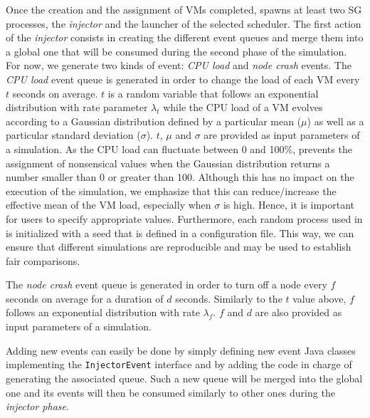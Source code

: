 Once the creation and the assignment of VMs completed, \vmps spawns at
least two SG processes, the \emph{injector} and the launcher of the
selected scheduler.  The first action of the \emph{injector} consists
in creating the different event queues and merge them into a global
one that will be consumed during the second phase of the simulation.
For now, we generate two kinds of event: \emph{CPU load} and
\emph{node crash} events.
%
The \emph{CPU load} event queue is generated in order to change the
load of each VM every $t$ seconds on average. $t$ is a random variable
that follows an exponential distribution with rate parameter
$\lambda_t$ while the CPU load of a VM evolves according to a Gaussian
distribution defined by a particular mean ($\mu$) as well as a
particular standard deviation ($\sigma$). $t$, $\mu$ and $\sigma$ are
provided as input parameters of a simulation.  As the CPU load can
fluctuate between 0 and 100\%, \vmps prevents the assignment of
nonsensical values when the Gaussian distribution returns a number
smaller than 0 or greater than 100. Although this has no impact on the
execution of the simulation, we emphasize that this can
reduce/increase the effective mean of the VM load, especially when
$\sigma$ is high.  Hence, it is important for users to specify
appropriate values.
Furthermore, each random process used in \vmps is initialized with a
seed that is defined in a configuration file. This way, we can ensure
that different simulations are reproducible and may be used to
establish fair comparisons.

The \emph{node crash} event queue is generated in order to turn off a
node every $f$ seconds on average for a duration of $d$ seconds.
Similarly to the $t$ value above, $f$ follows an exponential
distribution with rate $\lambda_f$. $f$ and $d$ are also provided as
input parameters of a simulation.

Adding new events can easily be done by simply defining new event Java
classes implementing the \texttt{InjectorEvent} interface and by
adding the code in charge of generating the associated queue. Such a
new queue will be merged into the global one and its events will then be
consumed similarly to other ones during the \emph{injector phase}.

